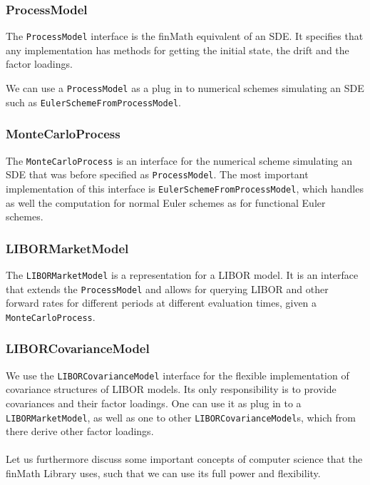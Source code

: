 \documentclass[12pt]{article}
\begin{document}
	\subsubsection*{ProcessModel}
	The \texttt{ProcessModel} interface is the finMath equivalent of an SDE. It specifies that any implementation has methods for getting the initial state, the drift and the factor loadings.
	
	
	
	We can use a \texttt{ProcessModel} as a plug in to numerical schemes simulating an SDE such as \texttt{EulerSchemeFromProcessModel}.
	
	\subsubsection*{MonteCarloProcess}
	The \texttt{MonteCarloProcess} is an interface for the numerical scheme simulating an SDE that was before specified as \texttt{ProcessModel}. The most important implementation of this interface is \texttt{EulerSchemeFromProcessModel}, which handles as well the computation for normal Euler schemes as for functional Euler schemes.
	
	\subsubsection*{LIBORMarketModel}
	The \texttt{LIBORMarketModel} is a representation for a LIBOR model. It is an interface that extends the \texttt{ProcessModel} and allows for querying LIBOR and other forward rates for different periods at different evaluation times, given a \texttt{MonteCarloProcess}.
	
	
	\subsubsection*{LIBORCovarianceModel}
	We use the \texttt{LIBORCovarianceModel} interface for the flexible implementation of covariance structures of LIBOR models. Its only responsibility is to provide covariances and their factor loadings. One can use it as plug in to a \texttt{LIBORMarketModel}, as well as one to other \texttt{LIBORCovarianceModel}s, which from there derive other factor loadings.
	\\
	\\
	Let us furthermore discuss some important concepts of computer science that the finMath Library uses, such that we can use its full power and flexibility.
	
\end{document}
